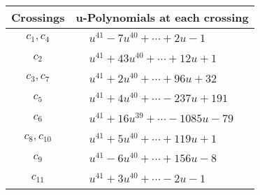 \documentclass[1p]{elsarticle_modified}
\theoremstyle{definition}
\begin{document}
\begin{tabular}{m{50pt}|m{274pt}}
Crossings & \hspace{64pt}u-Polynomials at each crossing \\
\hline $$\begin{aligned}c_{1},c_{4}\end{aligned}$$&$\begin{aligned}
&u^{41}-7 u^{40}+\cdots+2 u-1
\end{aligned}$\\
\hline $$\begin{aligned}c_{2}\end{aligned}$$&$\begin{aligned}
&u^{41}+43 u^{40}+\cdots+12 u+1
\end{aligned}$\\
\hline $$\begin{aligned}c_{3},c_{7}\end{aligned}$$&$\begin{aligned}
&u^{41}+2 u^{40}+\cdots+96 u+32
\end{aligned}$\\
\hline $$\begin{aligned}c_{5}\end{aligned}$$&$\begin{aligned}
&u^{41}+4 u^{40}+\cdots-237 u+191
\end{aligned}$\\
\hline $$\begin{aligned}c_{6}\end{aligned}$$&$\begin{aligned}
&u^{41}+16 u^{39}+\cdots-1085 u-79
\end{aligned}$\\
\hline $$\begin{aligned}c_{8},c_{10}\end{aligned}$$&$\begin{aligned}
&u^{41}+5 u^{40}+\cdots+119 u+1
\end{aligned}$\\
\hline $$\begin{aligned}c_{9}\end{aligned}$$&$\begin{aligned}
&u^{41}-6 u^{40}+\cdots+156 u-8
\end{aligned}$\\
\hline $$\begin{aligned}c_{11}\end{aligned}$$&$\begin{aligned}
&u^{41}+3 u^{40}+\cdots-2 u-1
\end{aligned}$\\
\hline
\end{tabular}\\~\\
\end{document}
